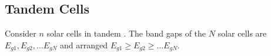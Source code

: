 \documentclass[12pt]{article}
\begin{document}
%

\subsection{Tandem Cells}



Consider $n$ solar cells in tandem \cite{Vos:80}.  The band gaps of the $N$ solar cells are 
$E_{g1}, E_{g2},\ldots E_{gN}$ and arranged $E_{g1} \geq E_{g2} \geq \ldots E_{gN}$.  
\end{document}
